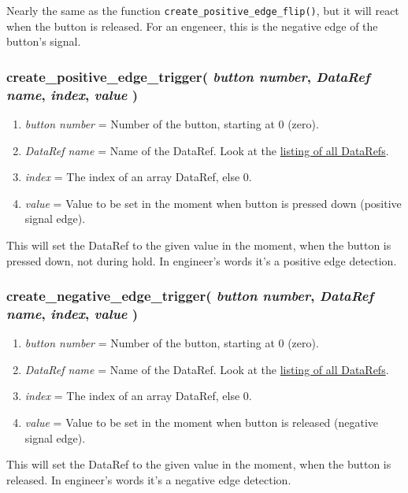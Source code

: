 \documentclass[11pt,parskip=half,a4paper]{scrartcl}
\begin{document}
Nearly the same as the function \verb|create_positive_edge_flip()|, but it will react when the button is released. For an engeneer, this is the negative edge of the button's signal.

\subsubsection{create\_positive\_edge\_trigger( \emph{button number}, \emph{DataRef name}, \emph{index}, \emph{value} )}

\begin{enumerate}
	\item \emph{button number} = Number of the button, starting at 0 (zero).
	\item \emph{DataRef name} = Name of the DataRef. Look at the \href{http://www.xsquawkbox.net/xpsdk/docs/DataRefs.html}{listing of all DataRefs}.
	\item \emph{index} = The index of an array DataRef, else 0.
	\item \emph{value} = Value to be set in the moment when button is pressed down (positive signal edge).
\end{enumerate}

This will set the DataRef to the given value in the moment, when the button is pressed down, not during hold. In engineer's words it's a positive edge detection.

\subsubsection{create\_negative\_edge\_trigger( \emph{button number}, \emph{DataRef name}, \emph{index}, \emph{value} )}

\begin{enumerate}
	\item \emph{button number} = Number of the button, starting at 0 (zero).
	\item \emph{DataRef name} = Name of the DataRef. Look at the \href{http://www.xsquawkbox.net/xpsdk/docs/DataRefs.html}{listing of all DataRefs}.
	\item \emph{index} = The index of an array DataRef, else 0.
	\item \emph{value} = Value to be set in the moment when button is released (negative signal edge).
\end{enumerate}

This will set the DataRef to the given value in the moment, when the button is released. In engineer's words it's a negative edge detection.
\end{document}
